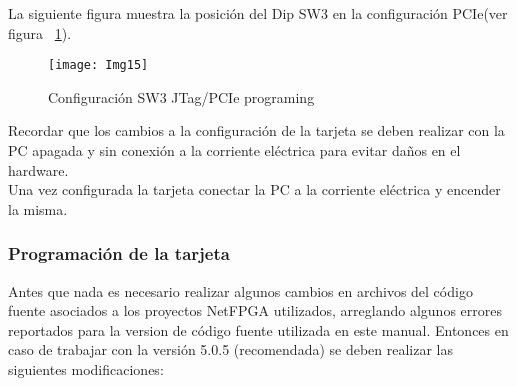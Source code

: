 La siguiente figura muestra la posición del Dip SW3 en la configuración PCIe(ver figura ~\ref{fig:Img15}).

\begin{figure}[htbp!] 
\centering    
\texttt{[image: Img15]}
\caption[Configuración SW3 JTag/PCIe programing]{Configuración SW3 JTag/PCIe programing}
\label{fig:Img15}
\end{figure}

Recordar que los cambios a la configuración de la tarjeta se deben realizar con la PC apagada y sin conexión a la corriente eléctrica para evitar daños en el hardware.\\

Una vez configurada la tarjeta conectar la PC a la corriente eléctrica y encender la misma.

\subsubsection{Programación de la tarjeta}
Antes que nada es necesario realizar algunos cambios en archivos del código fuente asociados a los proyectos NetFPGA utilizados, arreglando algunos errores reportados para la version de código fuente utilizada en este manual. Entonces en caso de trabajar con la versión 5.0.5 (recomendada) se deben realizar las siguientes modificaciones:

